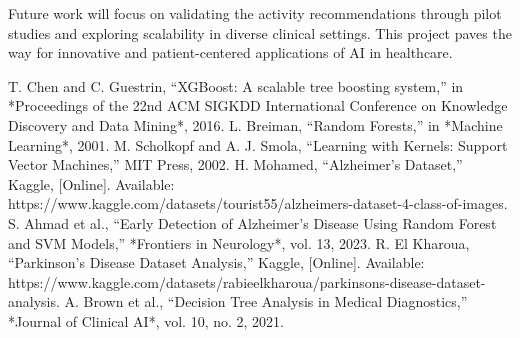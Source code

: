 \documentclass[conference]{IEEEtran}
\begin{document}
Future work will focus on validating the activity recommendations through pilot studies and exploring scalability in diverse clinical settings. This project paves the way for innovative and patient-centered applications of AI in healthcare.

\begin{thebibliography}{00}
 T. Chen and C. Guestrin, ``XGBoost: A scalable tree boosting system,'' in *Proceedings of the 22nd ACM SIGKDD International Conference on Knowledge Discovery and Data Mining*, 2016.
 L. Breiman, ``Random Forests,'' in *Machine Learning*, 2001.
 M. Scholkopf and A. J. Smola, ``Learning with Kernels: Support Vector Machines,'' MIT Press, 2002.
 H. Mohamed, ``Alzheimer's Dataset,'' Kaggle, [Online]. Available: https://www.kaggle.com/datasets/tourist55/alzheimers-dataset-4-class-of-images.
 S. Ahmad et al., ``Early Detection of Alzheimer’s Disease Using Random Forest and SVM Models,'' *Frontiers in Neurology*, vol. 13, 2023.
 R. El Kharoua, ``Parkinson's Disease Dataset Analysis,'' Kaggle, [Online]. Available: https://www.kaggle.com/datasets/rabieelkharoua/parkinsons-disease-dataset-analysis.
 A. Brown et al., ``Decision Tree Analysis in Medical Diagnostics,'' *Journal of Clinical AI*, vol. 10, no. 2, 2021.
\end{thebibliography}
\end{document}
